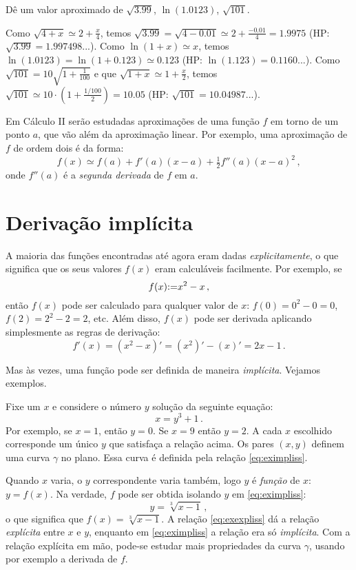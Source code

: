 \begin{exo}
Dê um valor aproximado de $\sqrt{3.99}$, 
$\ln(1.0123)$, $\sqrt{101}$.
\begin{sol}
Como $\sqrt{4+x}\simeq 2+\frac{x}{4}$, temos $\sqrt{3.99}=\sqrt{4-0.01}\simeq
2+\frac{-0.01}{4}=1.9975$ (HP: $\sqrt{3.99}=1.997498...$).
Como $\ln (1+x)\simeq x$, temos $\ln(1.0123)=\ln(1+0.123)\simeq 0.123$ (HP:
$\ln(1.123)=0.1160...$).
Como $\sqrt{101}=10\sqrt{1+\frac{1}{100}}$ e que $\sqrt{1+x}\simeq
1+\frac{x}{2}$, temos $\sqrt{101}\simeq 10\cdot(1+\frac{1/100}{2})=10.05$ (HP:
$\sqrt{101}=10.04987...$).
\end{sol}
\end{exo}

\begin{obs}
Em Cálculo II serão estudadas aproximações de uma função $f$ em torno
de um ponto $a$, que vão além da aproximação linear. Por exemplo, uma
aproximação de $f$ de ordem dois é da forma:
$$f(x)\simeq f(a)+f'(a)(x-a)+\tfrac12 f''(a)(x-a)^2\,,$$
onde $f''(a)$ é a \emph{segunda derivada} de $f$ em $a$.
\end{obs}

\section{Derivação implícita}

A maioria das funções encontradas até agora eram dadas 
 \emph{explicitamente}, o que significa que os seus valores
$f(x)$ eram calculáveis facilmente. Por exemplo, se $$f(x){:=}
x^2-x\,,$$ então $f(x)$ pode ser calculado para qualquer valor de
$x$: $f(0)=0^2-0=0$, $f(2)=2^2-2=2$, etc. 
Além disso, $f(x)$ pode ser derivada aplicando simplesmente as
regras de derivação: 
$$f'(x)=(x^2-x)'=(x^2)'-(x)'=2x-1\,.$$

Mas às vezes, uma função pode ser definida de maneira
\emph{implícita}. Vejamos exemplos.

\begin{ex}
Fixe um $x$ e considere o número $y$ solução da seguinte equação:
\begin{equation}\label{eq:eximpliss}
x=y^3+1\,.
\end{equation}
Por exemplo, se $x=1$, então $y=0$. Se $x=9$ então $y=2$.
A cada $x$ escolhido corresponde um único $y$ que
satisfaça a relação acima. Os pares $(x,y)$ definem uma curva $\gamma$ no plano.
Essa curva é definida pela relação \eqref{eq:eximpliss}.

Quando $x$ varia, o $y$ correspondente varia também, logo $y$ é
\emph{função} de $x$: $y=f(x)$. Na verdade, 
$f$ pode ser obtida isolando $y$ em \eqref{eq:eximpliss}:
\begin{equation}\label{eq:exexpliss}
y=\sqrt[3]{x-1}\,,
\end{equation}
o que significa que $f(x)=\sqrt[3]{x-1}$.
A relação \eqref{eq:exexpliss} dá a relação \emph{explícita} entre $x$ e
$y$, enquanto em \eqref{eq:eximpliss} a relação era só \emph{implícita}.
Com a relação explícita em mão, pode-se estudar mais propriedades da
curva $\gamma$, usando por exemplo a derivada de $f$.
\end{ex}

